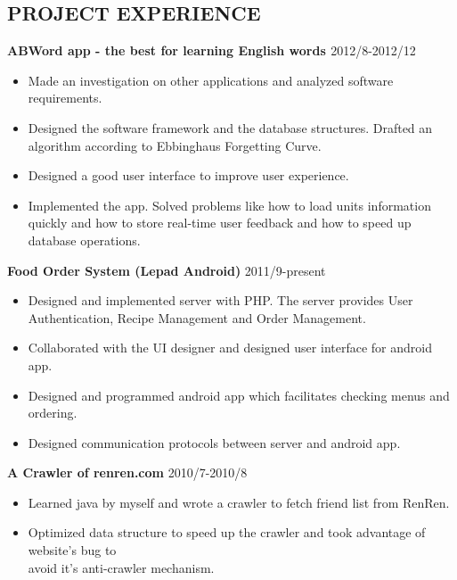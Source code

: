 \documentclass[a4paper]{res}
\begin{document}
\begin{resume}
\section{PROJECT EXPERIENCE}{
    \vspace{-0.05in}
    \hspace{-0.5in}{\rule{17.5cm}{0.02cm}}
	\textbf{\normalsize {ABWord app - the best for learning English words }} \hfill 2012/8-2012/12 \\
 	\vspace{-0.13in}
	\begin{itemize} \itemsep -2pt  %
        \item Made an investigation on other applications and analyzed software requirements.
		\item Designed the software framework and the database structures. Drafted an algorithm according to Ebbinghaus Forgetting Curve.
        \item Designed a good user interface to improve user experience.
        \item Implemented the app. Solved problems like how to load units information quickly and how to store real-time user feedback and how to speed up database operations.

 	\end{itemize}

    \vspace{-0.09in}
 	\textbf{\normalsize {Food Order System (Lepad Android)}} \hfill 2011/9-present \\
 	\vspace{-0.13in}
	\begin{itemize} \itemsep -2pt  %
		\item Designed and implemented server with PHP. The server provides User Authentication, Recipe Management and Order Management.
		\item Collaborated with the UI designer and designed user interface for android app.
        \item Designed and programmed android app which facilitates checking menus and ordering.
		\item Designed communication protocols between server and android app.
 	\end{itemize}

    \vspace{-0.09in}
 	\textbf{\normalsize {A Crawler of renren.com}} \hfill 2010/7-2010/8 \\
 	\vspace{-0.13in}
	\begin{itemize} \itemsep -2pt  %
		\item Learned java by myself and wrote a crawler to fetch friend list from RenRen.
		\item Optimized data structure to speed up the crawler and took advantage of website's bug to \\avoid it's anti-crawler mechanism.


\end{itemize}}
\end{resume}
\end{document}
